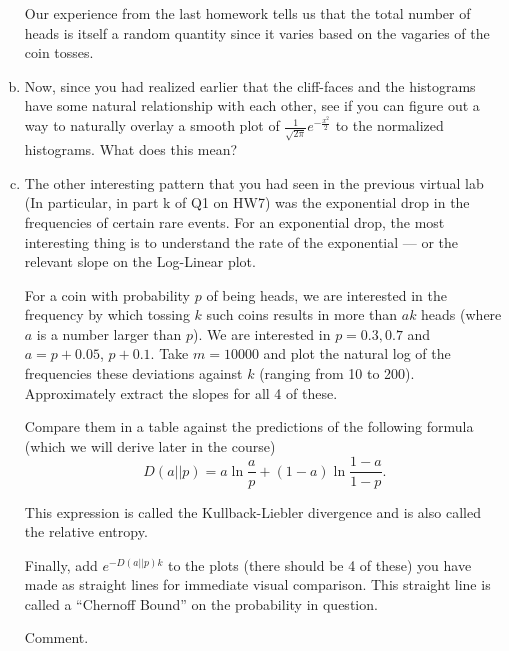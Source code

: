 \documentclass[]{article}
\newif\ifsolutions
\renewcommand{\answer}[1]{{\color{mydarkblue}\textbf{Solution:}#1}}
\begin{document}
\begin{qunlist}
\begin{enumerate}[a)]
 Our experience from the last homework tells us that the total number
 of heads is itself a random quantity since it varies based on the
 vagaries of the coin tosses.


\qpart 
\item Now, since you had realized earlier that the cliff-faces and the
  histograms have some natural relationship with each other, see if
  you can figure out a way to naturally overlay a smooth plot of
  $\frac{1}{\sqrt{2\pi}} e^{-\frac{x^2}{2}}$ to the normalized
  histograms. What does this mean?


\qpart
\item The other interesting pattern that you had seen in the previous
  virtual lab (In particular, in part k of Q1 on HW7) was the
  exponential drop in the frequencies of certain rare events. For an
  exponential drop, the most interesting thing is to understand the
  rate of the exponential --- or the relevant slope on the Log-Linear
  plot.  

  For a coin with probability $p$ of being heads, we are interested in
  the frequency by which tossing $k$ such coins results in more than
  $ak$ heads (where $a$ is a number larger than $p$). We are
  interested in $p=0.3,0.7$ and $a = p+0.05$,
  $p+0.1$.  Take $m = 10000$ and plot the natural log of the frequencies 
  these deviations against $k$ (ranging from 10 to 200). Approximately
  extract the slopes for all 4 of these.

  Compare them in a table against the predictions of the following
  formula (which we will derive later in the course)
  $$D(a||p) = a \ln \frac{a}{p} + (1-a) \ln \frac{1-a}{1-p}.$$
  
  This expression is called the Kullback-Liebler divergence and is also
  called the relative entropy. 

  Finally, add $e^{-D(a||p) k}$ to the plots (there should be 4 of
  these) you have made as straight lines for immediate visual
  comparison. This straight line is called a ``Chernoff Bound'' on the
  probability in question. 

  Comment. 


\end{enumerate}
\end{qunlist}
\end{document}
